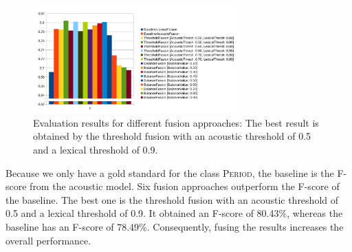 \begin{figure}[ht]
    \centering
    \includegraphics[width=0.7\textwidth]{img/fusion_eval.pdf}
    \caption{Evaluation results for different fusion approaches: The best result is obtained by the threshold fusion with an acoustic threshold of 0.5 and a lexical threshold of 0.9.}
    \label{fig:eval_fusion}
\end{figure}

Because we only have a gold standard for the class \textsc{Period}, the baseline is the F-score from the acoustic model.
Six fusion approaches outperform the F-score of the baseline.
The best one is the threshold fusion with an acoustic threshold of 0.5 and a lexical threshold of 0.9.
It obtained an F-score of 80.43\%, whereas the baseline has an F-score of 78.49\%.
Consequently, fusing the results increases the overall performance.
